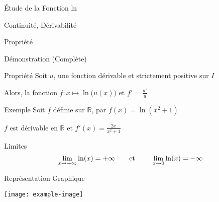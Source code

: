\documentclass{cours}
\begin{document}
\begin{Gpartie}{Étude de la Fonction ln}
\begin{Spartie}{Continuité, Dérivabilité}
\begin{SSpartie}{Propriété}
\begin{SSSpartie}{Démonstration (Complète)}
                \end{SSSpartie}
            \end{SSpartie}
            \begin{SSpartie}{Propriété}
                Soit $u$, une fonction dérivable et strictement positive sur $I$

                Alors, la fonction $f:x\mapsto\ln\big(u(x)\big)$ et $f'=\frac{u'}{u}$
                \begin{SSSpartie}{Exemple}
                    Soit $f$ définie sur $\mathbb{R}$, par $f(x)=\ln(x^2+1)$

                    $f$ est dérivable en $\mathbb{R}$ et $f'(x)=\frac{2x}{x^2+1}$
                \end{SSSpartie}
            \end{SSpartie}
        \end{Spartie}
        \begin{Spartie}{Limites}
            \[\lim_{x\to+\infty}\ln(x)=+\infty\text{\qquad et \qquad}\lim_{x\to 0}\ln(x)=-\infty\]

        \end{Spartie}
        \begin{Spartie}{Représentation Graphique}
            \begin{center}
                    \texttt{[image: example-image]}
                    \parbox{\linewidth}{}
            \end{center}
        \end{Spartie}
    \end{Gpartie}
\end{document}
